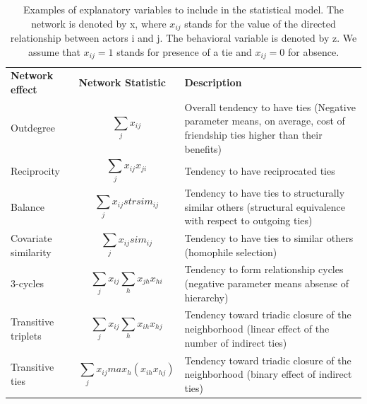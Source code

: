 \documentclass[11pt]{report}
\begin{document}
\begin{table}
\centering
\caption[Examples of explanatory effects to include in the statistical model]{Examples of explanatory variables to include in the statistical model. \cite{Steglich} The network is denoted by x, where $ x_{ij} $ stands for the value of the directed relationship between actors i and j. The behavioral variable is denoted by z. We assume that $ x_{ij} = 1 $ stands for presence of a tie and $ x_{ij} = 0 $ for absence. } 
\label{tableCovariates}
\begin{tabular}{m{} m{} m{}}
\hline\noalign{\smallskip}
\textbf{Network effect} & \textbf{Network Statistic} & \textbf{Description} \\
\noalign{\smallskip}\hline\noalign{\smallskip}
Outdegree & \begin{equation*} \sum_j x_{ij} \end{equation*} & Overall tendency to have ties (Negative parameter means, on average, cost of friendship ties higher than their benefits) \\ 
Reciprocity & \begin{equation*} \sum_j x_{ij} x_{ji} \end{equation*} & Tendency to have reciprocated ties \\ 
Balance & \begin{equation*} \sum_j x_{ij}strsim_{ij} \end{equation*} & Tendency to have ties to structurally similar others (structural equivalence with respect to outgoing ties) \\ 
Covariate similarity & \begin{equation*} \sum_j x_{ij} sim_{ij} \end{equation*} & Tendency to have ties to similar others (homophile selection) \\ 
3-cycles & \begin{equation*} \sum_j x_{ij} \sum_h x_{jh}x_{hi} \end{equation*} & Tendency to form relationship cycles (negative parameter means absense of hierarchy) \\
Transitive triplets & \begin{equation*} \sum_j x_{ij} \sum_h x_{ih}x_{hj} \end{equation*} &  Tendency toward triadic closure of the neighborhood (linear effect of the number of indirect ties) \\
Transitive ties & \begin{equation*} \sum_j x_{ij} max_h (x_{ih}x_{hj}) \end{equation*} & Tendency toward triadic closure of the neighborhood (binary effect of indirect ties) \\

\end{tabular}
\end{table}
\end{document}
